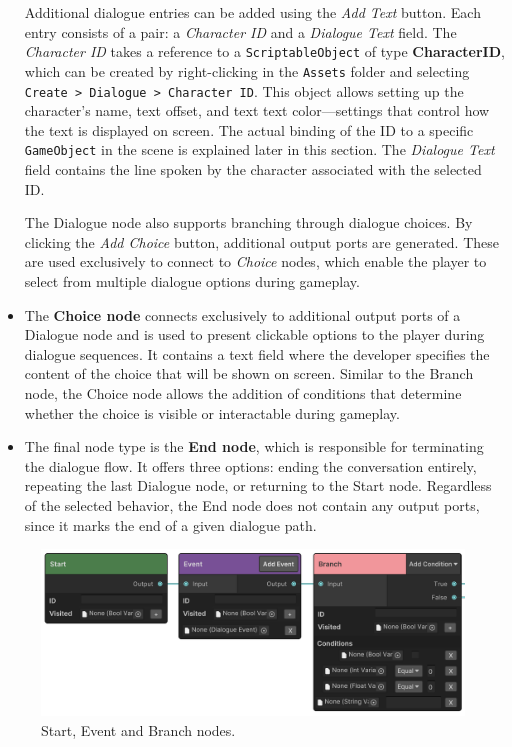\begin{itemize}
Additional dialogue entries can be added using the \textit{Add Text} button. Each entry consists of a pair: a \textit{Character ID} and a \textit{Dialogue Text} field. The \textit{Character ID} takes a reference to a \verb|ScriptableObject| of type \textbf{CharacterID}, which can be created by right-clicking in the \verb|Assets| folder and selecting \verb|Create > Dialogue > Character ID|. This object allows setting up the character's name, text offset, and text text color—settings that control how the text is displayed on screen. The actual binding of the ID to a specific \verb|GameObject| in the scene is explained later in this section. The \textit{Dialogue Text} field contains the line spoken by the character associated with the selected ID.

The Dialogue node also supports branching through dialogue choices. By clicking the \textit{Add Choice} button, additional output ports are generated. These are used exclusively to connect to \textit{Choice} nodes, which enable the player to select from multiple dialogue options during gameplay.

    \item The \textbf{Choice node} connects exclusively to additional output ports of a Dialogue node and is used to present clickable options to the player during dialogue sequences. It contains a text field where the developer specifies the content of the choice that will be shown on screen. Similar to the Branch node, the Choice node allows the addition of conditions that determine whether the choice is visible or interactable during gameplay. 
    \item  The final node type is the \textbf{End node}, which is responsible for terminating the dialogue flow. It offers three options: ending the conversation entirely, repeating the last Dialogue node, or returning to the Start node. Regardless of the selected behavior, the End node does not contain any output ports, since it marks the end of a given dialogue path. 
\end{itemize}
\begin{figure}[H]
\centering
\includegraphics[width=1\linewidth]{img/User doc/nodes1.png}
\caption{Start, Event and Branch nodes.}
\label{fig:Manual-Nodes1}
\end{figure}

